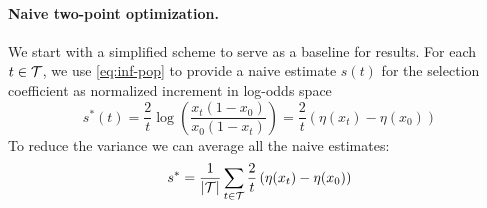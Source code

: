 \documentclass[11pt]{article}
\begin{document}
\paragraph{Naive two-point optimization.} We start with a simplified
scheme to serve as a baseline for results.  For each $t\in {\cal T}$, we
use \eqref{eq:inf-pop} to provide a naive estimate $s(t)$ for the
selection coefficient as normalized increment in log-odds space
\begin{equation}
	s^*(t)=\frac{2}{t} \log \left( \frac{x_t(1-x_0)}{x_0 (1-x_t)} \right) = \frac{2}{t}  
	\left( \eta(x_t)-\eta(x_0)\right)
	\label{eq:naive2point}
\end{equation}
To reduce the variance we can average all the naive estimates: 
\begin{equation}
	s^*=\frac{1}{|{\cal T}|}\sum_{t\in {\cal T}}\frac{2}{t}  \left( \eta(x_t)-\eta(x_0)\right)
	\label{eq:naive}
\end{equation}
\end{document}
